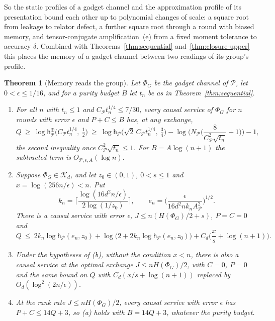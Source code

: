 \documentclass[11pt,a4paper]{article}
\theoremstyle{plain}
\newtheorem{theorem}{Theorem}[section]
\theoremstyle{definition}
\theoremstyle{remark}
\begin{document}
So the static profiles of a gadget channel and the approximation profile of its presentation bound each other up to polynomial changes of scale:
a square root from leakage to relator defect, a further square root through a round with biased memory, and tensor-conjugate
amplification~(e) from a fixed moment tolerance to accuracy $\delta$. Combined with Theorems~\ref{thm:sequential} and~\ref{thm:closure-upper} this
places the memory of a gadget channel between two readings of its group's profile.

\begin{theorem}[Memory reads the group]\label{thm:group-bracket}
Let $\Phi_G$ be the gadget channel of $\mathcal P$, let $0<\epsilon\le1/16$, and for a purity budget $B$ let $t_n$ be as in Theorem~\ref{thm:sequential}.
\begin{enumerate}[label=(\alph*)]
\item For all $n$ with $t_n\le1$ and $C_{\mathcal P}t_n^{1/4}\le7/30$, every causal service of $\Phi_G$ for $n$ rounds with error $\epsilon$ and $P+C\le B$ has, at any
exchange,
\[
Q\ \ge\ \log\mathsf h^\oplus_{\mathcal P}\big(C_{\mathcal P}t_n^{1/4},\ \tfrac12\big)\ \ge\ \log\mathsf h_{\mathcal P}\big(\sqrt2\,C_{\mathcal P}t_n^{1/4},\ \tfrac34\big)-\log\Big(N_{\mathcal P}\Big(\frac8{C_{\mathcal P}^2\sqrt{t_n}}+1\Big)\Big)-1,
\]
the second inequality once $C_{\mathcal P}^2\sqrt{t_n}\le1$. For $B=A\log(n+1)$ the subtracted term is $O_{\mathcal P,\epsilon,A}(\log n)$.
\item Suppose $\Phi_G\in\mathcal K_d$, and let $z_0\in(0,1)$, $0<s\le1$ and $x=\log(256n/\epsilon)<n$. Put
\[
k_n=\Big\lceil\frac{\log(16d^2n/\epsilon)}{2\log(1/z_0)}\Big\rceil,\qquad e_n=\Big(\frac{\epsilon}{16d^2nk_nA_{\mathcal P}^2}\Big)^{1/2}.
\]
There is a causal service with error $\epsilon$, $J\le n(H(\Phi_G)/2+s)$, $P=C=0$ and
\[
Q\ \le\ 2k_n\log\mathsf h_{\mathcal P}(e_n,z_0)+\log\big(2+2k_n\log\mathsf h_{\mathcal P}(e_n,z_0)\big)+C_d\Big(\frac xs+\log(n+1)\Big).
\]
\item Under the hypotheses of (b), without the condition $x<n$, there is also a causal service at the optimal exchange $J\le nH(\Phi_G)/2$, with $C=0$,
$P=0$ and the same bound on $Q$ with $C_d(x/s+\log(n+1))$ replaced by $O_d(\log^2(2n/\epsilon))$.
\item At the rank rate $J\le nH(\Phi_G)/2$, every causal service with error $\epsilon$ has $P+C\le14Q+3$, so (a) holds with $B=14Q+3$, whatever the
purity budget.
\end{enumerate}
\end{theorem}
\end{document}
